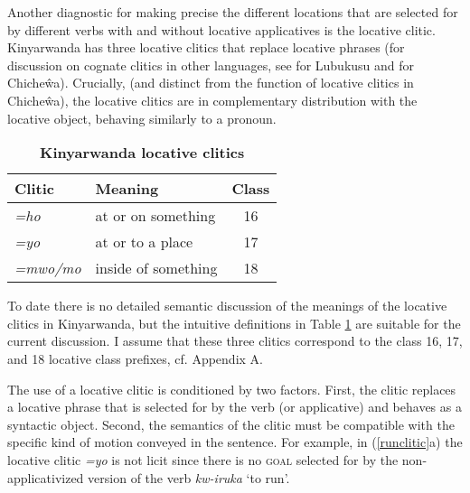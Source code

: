 \documentclass[output=paper]{langsci/langscibook}
\begin{document}
Another diagnostic for making precise the different locations that are selected for by different verbs with and without locative applicatives is the locative clitic. Kinyarwanda has three locative clitics that  replace locative phrases (for discussion on cognate clitics in other languages, see \citet{diercks:2011} for Lubukusu and \citet{simango:2012} for Chicheŵa). 	Crucially, (and distinct from the function of locative clitics in Chicheŵa), the locative clitics are in complementary distribution with the locative object, behaving similarly to a pronoun. 
%
\begin{table}[ht]
      \begin{center}	
\caption{\textbf{Kinyarwanda locative clitics}}
      \begin{tabular}[t]{llc}\\\hline
	      Clitic			& Meaning				& Class \\\hline
			\emph{=ho}  & at or on something	& 16 \\
		      
		\emph{=yo} 	&  at or to a place 		& 17 \\

		\emph{=mwo/mo}  &  inside of something & 18\\
      
      \hline
	\end{tabular}
\label{tab:clitic} 
			\end{center}
\end{table}
%
To date there is no detailed semantic discussion of the meanings of the locative clitics in Kinyarwanda, but the intuitive definitions in Table \ref{tab:clitic} are suitable for the current discussion. I assume that these three clitics correspond to the class 16, 17, and 18 locative class prefixes, cf. Appendix A.  

The use of a locative clitic is conditioned by two factors. First, the clitic replaces a locative phrase that is selected for by the verb (or applicative) and behaves as a syntactic object. Second, the semantics of the clitic must be compatible with the specific kind of motion conveyed in the sentence.  For example, in (\ref{runclitic}a) the locative clitic \emph{=yo} is not licit since there is no {\scshape goal}  selected for by the non-applicativized version of the verb \emph{kw-iruka} `to run'. 
\end{document}
